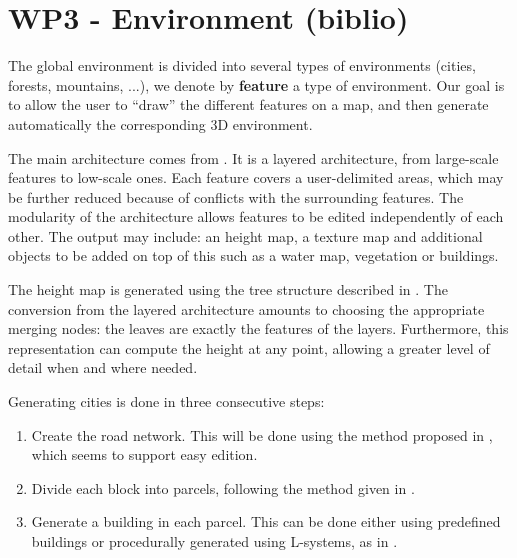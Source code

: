 \section{WP3 - Environment (biblio)}
\label{WP3}
The global environment is divided into several types of environments (cities, forests, mountains, ...), we denote by \textbf{feature} a type of environment. Our goal is to allow the user to ``draw'' the different features on a map, and then generate automatically the corresponding 3D environment.

The main architecture comes from \cite{DeclarativeArchitecture}. It is a
layered architecture, from large-scale features to low-scale ones. Each feature
covers a user-delimited areas, which may be further reduced because of
conflicts with the surrounding features. The modularity of the architecture
allows features to be edited independently of each other. The output may
include: an height map, a texture map and additional objects to be added on top
of this such as a water map, vegetation or buildings.

The height map is generated using the tree structure described in
\cite{FeatureTree}. The conversion from the layered architecture amounts to
choosing the appropriate merging nodes: the leaves are exactly the features of
the layers. Furthermore, this representation can compute the height at any
point, allowing a greater level of detail when and where needed.

Generating cities is done in three consecutive steps:
\begin{enumerate}
  \item Create the road network. This will be done using the method proposed in
    \cite{StreetTensors}, which seems to support easy edition.
  \item Divide each block into parcels, following the method given in
    \cite{PGParcels}.
  \item Generate a building in each parcel. This can be done either using
    predefined buildings or procedurally generated using L-systems, as in
    \cite{FLSystem}.
\end{enumerate}
